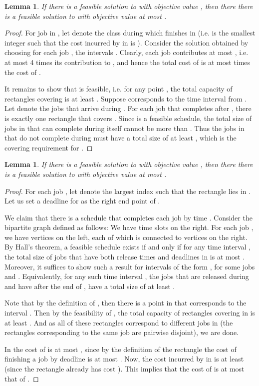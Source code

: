 \documentclass[11pt]{article}
\newtheorem{lemma}[thm]{Lemma}
\begin{document}
\begin{lemma}
\label{gc:s}
If there is a feasible solution  to  
with objective value , 
then there there is a feasible solution  to 
with objective value at most .
\end{lemma}
\begin{proof}
For job  in , 
let  denote the class during which  finishes in 
(i.e.  is the smallest integer such that the cost 
incurred by  in  is ).
Consider the solution  obtained by choosing for each job , 
the intervals .
Clearly, each job contributes at most ,  i.e. at most 4 times its contribution to , and hence the total cost of   
is at most  times the cost of .

It remains to show that   is feasible, i.e. for any point , the total capacity of rectangles covering  is at least . 
Suppose  corresponds to the time interval  from . 
Let  denote the jobs that arrive during . 
For  each job  that completes after , 
there is exactly one rectangle  that covers . 
Since  is a feasible schedule, the total size of jobs in  
that can complete during  itself cannot be more than 
. Thus the jobs in  that do not complete during  
must have a total size of at least ,
which is the covering requirement for .
\end{proof}

\begin{lemma}
\label{s:gc}
If there is a feasible solution  to  
with objective value , 
then there there is a feasible solution  to 
with objective value at most .
\end{lemma}
\begin{proof}
For each job , let  denote the largest index such that the rectangle  lies in .
Let us set a deadline  for  as the right end point of . 


We claim that there is a schedule  that completes each job
 by time . Consider the bipartite graph defined as follows: We have time slots  on the right. For each job , we have
 vertices on the left, each of which is connected to vertices  on the right.
By Hall's theorem, a feasible schedule exists if and only if for any time interval , the total size of jobs
that have both release times and deadlines in  is at most .
Moreover, it suffices to show such a result for intervals  of the form 
, for some jobs  and .
Equivalently, for any such time interval , 
the jobs  that are released during  and have  after the end of ,
have a total size of at least . 
 
Note that by the definition of , then there is a point
 in  that corresponds to the interval .
Then by the feasibility of , 
the total capacity of rectangles covering  in 
is at least . And as all of these rectangles 
correspond to different jobs in  (the rectangles corresponding to the same job are pairwise disjoint), we are done.


In  the cost of  is at most , since by the definition of the rectangle  the cost of finishing a job by deadline  is at most . Now, the cost incurred by  in  is at least  (since the rectangle  already has cost ). This implies that the cost of  is at most that of .
\end{proof}
\end{document}
